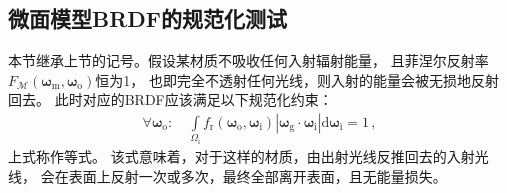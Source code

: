 \subsection{微面模型BRDF的规范化测试}\label{sub:微面模型BRDF的规范化测试}
本节继承上节的记号。假设某材质不吸收任何入射辐射能量，
且菲涅尔反射率$F_{\mathcal{M}}({\bm\omega}_{\mathrm{m}},{\bm\omega}_{\mathrm{o}})$恒为1，
也即完全不透射任何光线，则入射的能量会被无损地反射回去。
此时对应的BRDF应该满足以下规范化约束：
\begin{align}\label{eq:08ex-01-WhiteFurnaceTest}
    \forall {\bm\omega}_{\mathrm{o}}: \quad\int\limits_{{\varOmega}_{\mathrm{i}}}
    f_{\mathrm{r}}({\bm\omega}_{\mathrm{o}},{\bm\omega}_{\mathrm{i}})
    |{\bm\omega}_{\mathrm{g}}\cdot{\bm\omega}_{\mathrm{i}}|\mathrm{d}{\bm\omega}_{\mathrm{i}}=1\, ,
\end{align}
上式称作等式。
该式意味着，对于这样的材质，由出射光线反推回去的入射光线，
会在表面上反射一次或多次，最终全部离开表面，且无能量损失。


